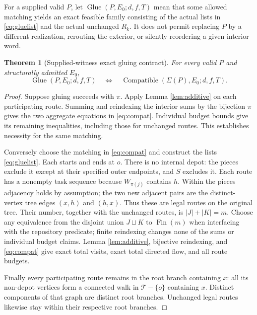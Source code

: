 \documentclass[11pt]{article}
\newtheorem{theorem}[definition]{Theorem}
\theoremstyle{remark}
\newcommand{\Compat}{\operatorname{Compatible}}
\newcommand{\Glue}{\operatorname{Glue}}
\begin{document}
For a supplied valid $P$, let $\Glue(P,E_0;d,f,T)$ mean that some allowed
matching yields an exact feasible family consisting of the actual lists
in \eqref{eq:gluelist} and the actual unchanged $R_k$.
It does not permit replacing $P$ by a different realization, rerouting the
exterior, or silently reordering a given interior word.

\begin{theorem}[Supplied-witness exact gluing contract]\label{thm:glue}
For every valid $P$ and structurally admitted $E_0$,
\[
 \boxed{\Glue(P,E_0;d,f,T)\quad\Longleftrightarrow\quad
 \Compat(\Sigma(P),E_0;d,f,T).}
\]
\end{theorem}
\begin{proof}
Suppose gluing succeeds with $\pi$. Apply Lemma \ref{lem:additive} on each
participating route. Summing and reindexing the interior sums by the bijection
$\pi$ gives the two aggregate equations in \eqref{eq:compat}. Individual
budget bounds give its remaining inequalities, including those for unchanged
routes. This establishes necessity for the same matching.

Conversely choose the matching in \eqref{eq:compat} and construct the lists
\eqref{eq:gluelist}. Each starts and ends at $o$. There is no internal depot:
the pieces exclude it except at their specified outer endpoints, and $S$
excludes it. Each route has a nonempty task sequence because $W_{\pi(j)}$
contains $h$. Within the pieces adjacency holds by assumption; the two new
adjacent pairs are the distinct-vertex tree edges $(x,h)$ and $(h,x)$.
Thus these are legal routes on the original tree. Their number, together
with the unchanged routes, is $|J|+|K|=m$.
Choose any equivalence from the disjoint union $J\sqcup K$ to
$\operatorname{Fin}(m)$ when interfacing with the repository predicate;
finite reindexing changes none of the sums or individual budget claims.
Lemma \ref{lem:additive}, bijective reindexing, and \eqref{eq:compat} give
exact total visits, exact total directed flow, and all route budgets.

Finally every participating route remains in the root branch containing $x$:
all its non-depot vertices form a connected walk in $\mathcal T-\{o\}$
containing $x$. Distinct components of that graph are distinct root branches.
Unchanged legal routes likewise stay within their respective root branches.
\end{proof}
\end{document}
